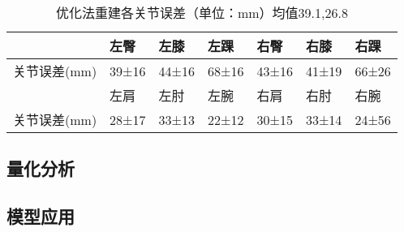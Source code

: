 \begin{table}[H]
    \centering
    \begin{tabular}{lllllll}
        \hline
                      & 左臀   & 左膝   & 左踝   & 右臀   & 右膝   & 右踝   \\
        \hline
         关节误差(mm) & 39±16  & 44±16  & 68±16  & 43±16  & 41±19  & 66±26  \\
                      & 左肩   & 左肘   & 左腕   & 右肩   & 右肘   & 右腕   \\
         关节误差(mm) & 28±17  & 33±13  & 22±12  & 30±15  & 33±14  & 24±56  \\
        \hline
        \end{tabular}
    \caption{优化法重建各关节误差（单位：mm）均值39.1,26.8\label{tab:3derroropt}}
\end{table} 
\subsection{量化分析}

\subsection{模型应用}

 
